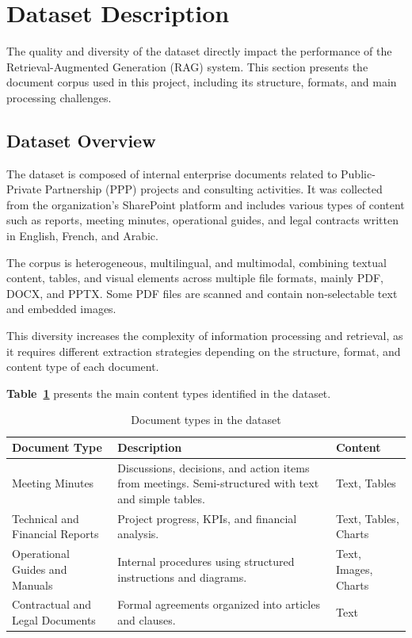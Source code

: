 \section{Dataset Description}
\label{sec:dataset}

The quality and diversity of the dataset directly impact the performance
of the Retrieval-Augmented Generation (RAG) system. This section presents
the document corpus used in this project, including its structure, formats,
and main processing challenges.

\subsection{Dataset Overview}

The dataset is composed of internal enterprise documents related to
Public-Private Partnership (PPP) projects and consulting activities. It
was collected from the organization's SharePoint platform and includes
various types of content such as reports, meeting minutes, operational
guides, and legal contracts written in English, French, and Arabic.

The corpus is heterogeneous, multilingual, and multimodal, combining
textual content, tables, and visual elements across multiple file formats,
mainly PDF, DOCX, and PPTX. Some PDF files are scanned and contain
non-selectable text and embedded images.

This diversity increases the complexity of information processing and
retrieval, as it requires different extraction strategies depending on
the structure, format, and content type of each document.

\textbf{Table~\ref{tab:doc_types}} presents the main content types identified
in the dataset.

\begin{table}[H]
\centering
\caption{Document types in the dataset}
\renewcommand{\arraystretch}{1.3}
\begin{tabular}{|l|p{6cm}|p{3cm}|}
\hline
\textbf{Document Type} & \textbf{Description} & \textbf{Content} \\
\hline
Meeting Minutes &
Discussions, decisions, and action items from meetings.
Semi-structured with text and simple tables. &
Text, Tables \\
\hline
Technical and Financial Reports &
Project progress, KPIs, and financial analysis. &
Text, Tables, Charts \\
\hline
Operational Guides and Manuals &
Internal procedures using structured instructions and diagrams. &
Text, Images, Charts \\
\hline
Contractual and Legal Documents &
Formal agreements organized into articles and clauses. &
Text \\
\hline
\end{tabular}
\label{tab:doc_types}
\end{table}

